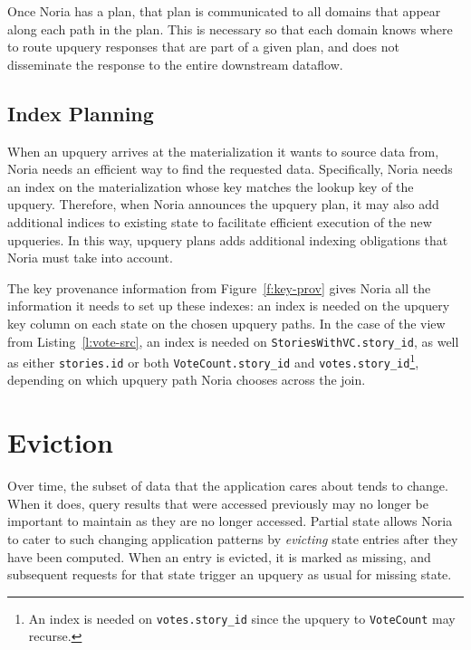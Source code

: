 Once Noria has a plan, that plan is communicated to all domains that appear
along each path in the plan. This is necessary so that each domain knows where
to route upquery responses that are part of a given plan, and does not
disseminate the response to the entire downstream dataflow.

\subsection{Index Planning}

When an upquery arrives at the materialization it wants to source data from,
Noria needs an efficient way to find the requested data. Specifically, Noria
needs an index on the materialization whose key matches the lookup key of the
upquery. Therefore, when Noria announces the upquery plan, it may also add
additional indices to existing state to facilitate efficient execution of the
new upqueries. In this way, upquery plans adds additional indexing obligations
that Noria must take into account.

The key provenance information from Figure~\ref{f:key-prov} gives Noria all the
information it needs to set up these indexes: an index is needed on the upquery
key column on each state on the chosen upquery paths. In the case of the view
from Listing~\ref{l:vote-src}, an index is needed on
\texttt{StoriesWithVC.story\_id}, as well as either \texttt{stories.id} or both
\texttt{VoteCount.story\_id} and \texttt{votes.story\_id}\footnote{An index is
needed on \texttt{votes.story\_id} since the upquery to \texttt{VoteCount} may
recurse.}, depending on which upquery path Noria chooses across the join.

\section{Eviction}
\label{s:eviction}

Over time, the subset of data that the application cares about tends to change.
When it does, query results that were accessed previously may no longer be
important to maintain as they are no longer accessed. Partial state allows Noria
to cater to such changing application patterns by \textit{evicting} state
entries after they have been computed. When an entry is evicted, it is marked as
missing, and subsequent requests for that state trigger an upquery as usual for
missing state.
